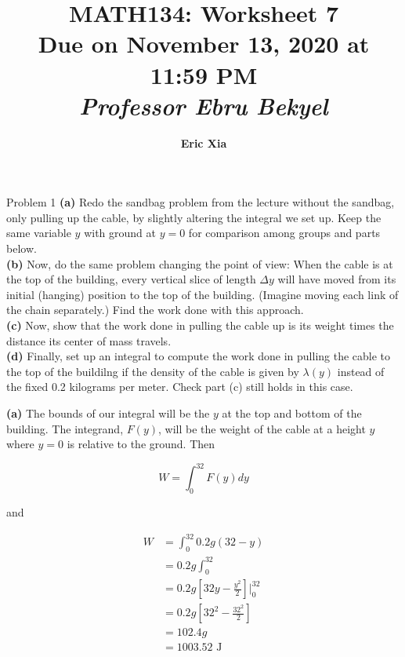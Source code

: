\documentclass{article}
\title{
    \vspace{2in}
    \textmd{\textbf{MATH134: Worksheet 7}}\\
    \normalsize\vspace{0.1in}\small{Due on November 13, 2020 at 11:59 PM}\\
    \vspace{0.1in}\large{\textit{Professor Ebru Bekyel}}
    \vspace{3in}
}
\author{\textbf{Eric Xia}}
\date{}
\begin{document}
    \maketitle
    \pagebreak

    \thispagestyle{2}

    \begin{tbhtheorem}{Problem 1}
        \textbf{(a)} Redo the sandbag problem from the lecture without the sandbag, only pulling up the cable, by slightly altering the integral we set up. Keep the same variable $y$ with ground at $y=0$ for comparison
        among groups and parts below. \\
        \textbf{(b)} Now, do the same problem changing the point of view: When the cable is at the top of the building, every vertical slice of length $\Delta y$ will have moved from its initial (hanging) position to the
        top of the building. (Imagine moving each link of the chain separately.) Find the work done with this approach. \\
        \textbf{(c)} Now, show that the work done in pulling the cable up is its weight times the distance its center of mass travels. \\
        \textbf{(d)} Finally, set up an integral to compute the work done in pulling the cable to the top of the buildilng if the density of the cable is given by $\lambda (y)$ instead of the fixed 0.2 kilograms per meter.
        Check part (c) still holds in this case.
    \end{tbhtheorem}

    \textbf{(a)}
    The bounds of our integral will be the $y$ at the top and bottom of the building. The integrand, $F(y)$, will be the weight of the cable at a height $y$ where $y=0$ is relative to the ground. Then

    \[
        W = \int_0^{32} F(y)dy
    \]

    and

    \begin{align*}
        W   &= \int_0^{32} 0.2g(32-y) \\
            &= 0.2g\int_0^{32} \\
            &= 0.2g\left[32y-\frac{y^2}{2}\right]\Big|_0^{32} \\
            &= 0.2g\left[32^2-\frac{32^2}{2}\right] \\
            &= 102.4g \\
            &= 1003.52 \text{ J}
    \end{align*}
\end{document}
